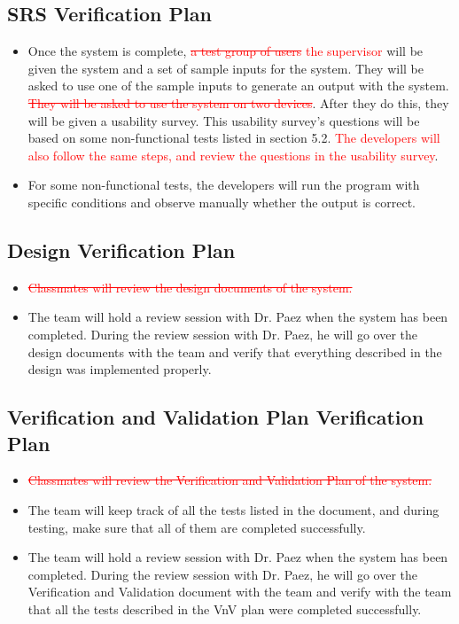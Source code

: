 \documentclass[12pt, titlepage]{article}
\begin{document}
\subsection{SRS Verification Plan}
\label{section:4.2}
\begin{itemize}
    \item Once the system is complete, \textcolor{red}{\sout{a test group of users} the supervisor}  will be given the system and a set of sample inputs for the system. They will be asked to use one of the sample inputs to generate an output with the system. \textcolor{red}{\sout{They will be asked to use the system on two devices}}. After they do this, they will be given a usability survey. This usability survey's questions will be based on some non-functional tests listed in section 5.2. \textcolor{red}{The developers will also follow the same steps, and review the questions in the usability survey}.
    \item For some non-functional tests, the developers will run the program with specific conditions and observe manually whether the output is correct.
\end{itemize}


\subsection{Design Verification Plan}
\label{section:4.3}

\begin{itemize}
    \item \textcolor{red}{\sout{Classmates will review the design documents of the system.}}
    \item The team will hold a review session with Dr. Paez when the system has been completed. During the review session with Dr. Paez, he will go over the design documents with the team and verify that everything described in the design was implemented properly.
\end{itemize}

\subsection{Verification and Validation Plan Verification Plan}
\label{section:4.4}

\begin{itemize}
    \item \textcolor{red}{\sout{Classmates will review the Verification and Validation Plan of the system.}}
    \item The team will keep track of all the tests listed in the document, and during testing, make sure that all of them are completed successfully.
    \item The team will hold a review session with Dr. Paez when the system has been completed. During the review session with Dr. Paez, he will go over the Verification and Validation document with the team and verify with the team that all the tests described in the VnV plan were completed successfully.
\end{itemize}
\end{document}
